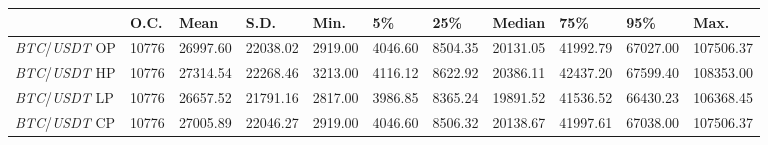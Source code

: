 \begin{tabular}{lllllllllll}
\toprule
 & \textbf{O.C.} & \textbf{Mean} & \textbf{S.D.} & \textbf{Min.} & \textbf{5\%} & \textbf{25\%} & \textbf{Median} & \textbf{75\%} & \textbf{95\%} & \textbf{Max.} \\
\midrule
\emph{BTC}/\emph{USDT} OP & 10776 & 26997.60 & 22038.02 & 2919.00 & 4046.60 & 8504.35 & 20131.05 & 41992.79 & 67027.00 & 107506.37 \\
\emph{BTC}/\emph{USDT} HP & 10776 & 27314.54 & 22268.46 & 3213.00 & 4116.12 & 8622.92 & 20386.11 & 42437.20 & 67599.40 & 108353.00 \\
\emph{BTC}/\emph{USDT} LP & 10776 & 26657.52 & 21791.16 & 2817.00 & 3986.85 & 8365.24 & 19891.52 & 41536.52 & 66430.23 & 106368.45 \\
\emph{BTC}/\emph{USDT} CP & 10776 & 27005.89 & 22046.27 & 2919.00 & 4046.60 & 8506.32 & 20138.67 & 41997.61 & 67038.00 & 107506.37 \\
\bottomrule
\end{tabular}
